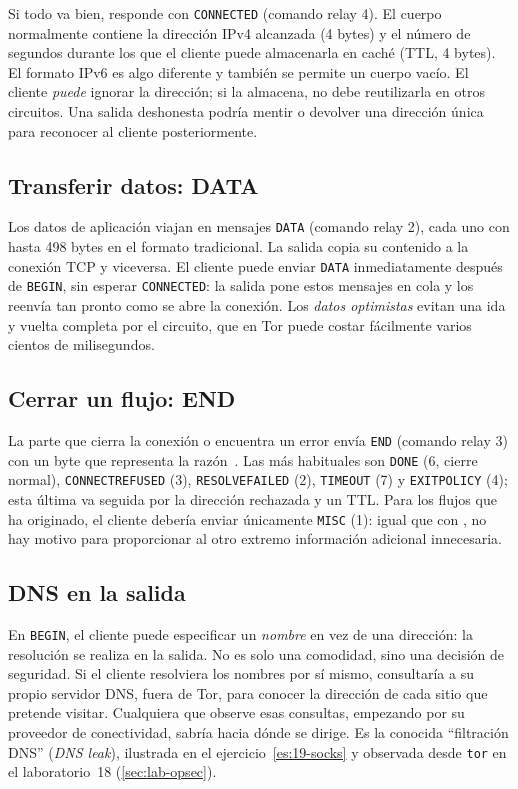 Si todo va bien, responde con \texttt{CONNECTED} (comando relay 4). El cuerpo normalmente contiene la dirección IPv4 alcanzada (4 bytes) y el número de segundos durante los que el cliente puede almacenarla en caché (TTL, 4 bytes). El formato IPv6 es algo diferente y también se permite un cuerpo vacío. El cliente \emph{puede} ignorar la dirección; si la almacena, no debe reutilizarla en otros circuitos. Una salida deshonesta podría mentir o devolver una dirección única para reconocer al cliente posteriormente.

\subsection{Transferir datos: DATA}

Los datos de aplicación viajan en mensajes \texttt{DATA} (comando relay 2), cada uno con hasta 498 bytes en el formato tradicional. La salida copia su contenido a la conexión TCP y viceversa. El cliente puede enviar \texttt{DATA} inmediatamente después de \texttt{BEGIN}, sin esperar \texttt{CONNECTED}: la salida pone estos mensajes en cola y los reenvía tan pronto como se abre la conexión. Los \emph{datos optimistas} evitan una ida y vuelta completa por el circuito, que en Tor puede costar fácilmente varios cientos de milisegundos.

\subsection{Cerrar un flujo: END}

La parte que cierra la conexión o encuentra un error envía \texttt{END} (comando relay 3) con un byte que representa la razón~. Las más habituales son \texttt{DONE} (6, cierre normal), \texttt{CONNECTREFUSED} (3), \texttt{RESOLVEFAILED} (2), \texttt{TIMEOUT} (7) y \texttt{EXITPOLICY} (4); esta última va seguida por la dirección rechazada y un TTL. Para los flujos que ha originado, el cliente debería enviar únicamente \texttt{MISC} (1): igual que con , no hay motivo para proporcionar al otro extremo información adicional innecesaria.

\subsection{DNS en la salida}\label{sec:stream-dns}

En \texttt{BEGIN}, el cliente puede especificar un \emph{nombre} en vez de una dirección: la resolución se realiza en la salida. No es solo una comodidad, sino una decisión de seguridad. Si el cliente resolviera los nombres por sí mismo, consultaría a su propio servidor DNS, fuera de Tor, para conocer la dirección de cada sitio que pretende visitar. Cualquiera que observe esas consultas, empezando por su proveedor de conectividad, sabría hacia dónde se dirige. Es la conocida \enquote{filtración DNS} (\emph{DNS leak}), ilustrada en el ejercicio~\ref{es:19-socks} y observada desde \texttt{tor} en el laboratorio~18 (\cref{sec:lab-opsec}).

